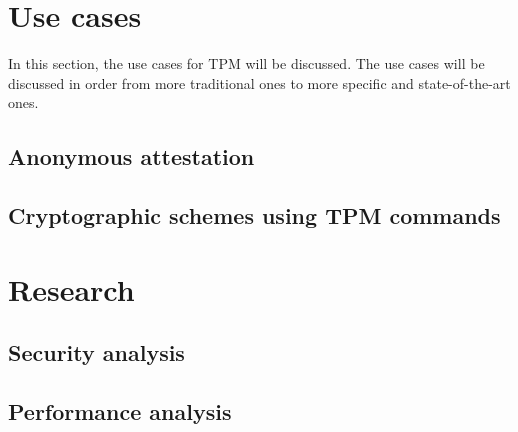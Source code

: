 \section{Use cases}
In this section, the use cases for TPM will be discussed. The use cases will be discussed in order from more traditional ones to more specific and state-of-the-art ones.

\subsection{Anonymous attestation}

\subsection{Cryptographic schemes using TPM commands}

\section{Research}

\subsection{Security analysis}

\subsection{Performance analysis}

